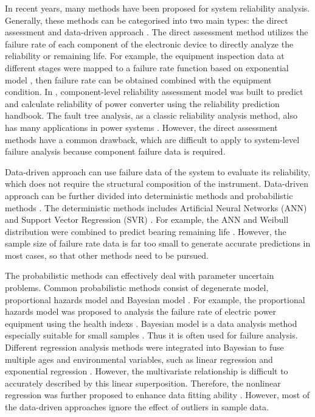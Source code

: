 \documentclass[journal,twoside,web]{ieeecolor}
\begin{document}
In recent years, many methods have been proposed for system reliability analysis. Generally, these methods can be categorised into two main types: the direct assessment and data-driven approach \cite{LIPU2018115, 7904628}. 
The direct assessment method utilizes the failure rate of each component of the electronic device to directly analyze the reliability or remaining life. For example, the equipment inspection data at different stages were mapped to a failure rate function based on exponential model \cite{1294982}, then failure rate can be obtained combined with the equipment condition. In \cite{8617681}, component-level reliability assessment model was built to predict and calculate reliability of power converter using the reliability prediction handbook. The fault tree analysis, as a classic reliability analysis method, also has many applications in power systems \cite{7384776}. However, the direct assessment methods have a common drawback, which are difficult to apply to system-level failure analysis because component failure data is required.

Data-driven approach can use failure data of the system to evaluate its reliability, which does not require the structural composition of the instrument. Data-driven approach can be further divided into deterministic methods and probabilistic methods \cite{7904628}. The deterministic methods includes Artificial Neural Networks (ANN)\cite{KUTYLOWSKA201541} and Support Vector Regression (SVR) \cite{8186602}. For example, the ANN and Weibull distribution were combined to predict bearing remaining life \cite{article1}. However, the sample size of failure rate data is far too small to generate accurate predictions in most cases, so that other methods need to be pursued. 

The probabilistic methods can effectively deal with parameter uncertain problems. Common probabilistic methods consist of degenerate model, proportional hazards model and Bayesian model \cite{LIU201839}. For example, the proportional hazards model was proposed to analysis the failure rate of electric power equipment using the health indexs \cite{7018977}. Bayesian model is a data analysis method especially suitable for small samples \cite{QIU201921}. Thus it is often used for failure analysis. Different regression analysis methods were integrated into Bayesian to fuse multiple ages and environmental variables, such as linear regression and exponential regression \cite{ 1046900, GUO2015173}. However, the multivariate relationship is difficult to accurately described by this linear superposition. Therefore, the nonlinear regression was further proposed to enhance data fitting ability \cite{FUMO2015332}.
However, most of the data-driven approaches ignore the effect of outliers in sample data.
\end{document}
